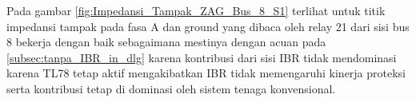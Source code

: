 Pada gambar \ref{fig:Impedansi_Tampak_ZAG_Bus_8_S1} terlihat untuk titik impedansi tampak pada fasa A dan ground yang dibaca oleh relay 21 dari sisi bus 8 bekerja dengan baik sebagaimana mestinya dengan acuan pada \ref{subsec:tanpa_IBR_in_dlg} karena kontribusi dari sisi IBR tidak mendominasi karena TL78 tetap aktif mengakibatkan IBR tidak memengaruhi kinerja proteksi serta kontribusi tetap di dominasi oleh sistem tenaga konvensional.







